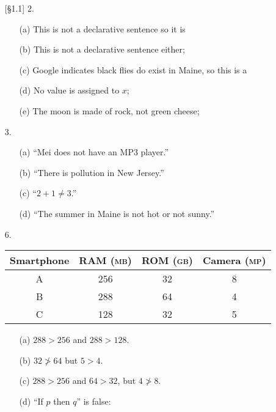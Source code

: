 \documentclass{article}
\begin{document}
\begin{enumerate}
    \item[{[\S 1.1]} 2.]
    \begin{itemize}
        \item[(a)] This is not a declarative sentence so it is 
        \item[(b)] This is not a declarative sentence either; 
        \item[(c)] Google indicates black flies do exist in Maine, so this is a 
        \item[(d)] No value is assigned to $x$; 
        \item[(e)] The moon is made of rock, not green cheese; 
    \end{itemize}
    \item[3.]
    \begin{itemize}
        \item[(a)] ``Mei does not have an MP3 player.''
        \item[(b)] ``There is pollution in New Jersey.''
        \item[(c)] ``$2+1 \neq 3$.''
        \item[(d)] ``The summer in Maine is not hot or not sunny.''
    \end{itemize}
    \item[6.] \hfill
    \vspace{-0.2in}
    \begin{center}
        \begin{tabular}{c|c|c|c}
        Smartphone & RAM \textsc{(mb)} & ROM \textsc{(gb)} & Camera \textsc{(mp)} \\\hline
        A & 256 & 32 & 8 \\\hline
        B & 288 & 64 & 4 \\\hline
        C & 128 & 32 & 5 \\
        \end{tabular}
    \end{center}
    \begin{itemize}
        \item[(a)]  $288 > 256$ and $288 > 128$.
        \item[(b)]  $32 \ngtr 64$ but $5 > 4$.
        \item[(c)]  $288 > 256$ and $64 > 32$, but $4 \ngtr 8$.
        \item[(d)]  ``If $p$ then $q$'' is false:

\end{itemize}
\end{enumerate}
\end{document}
